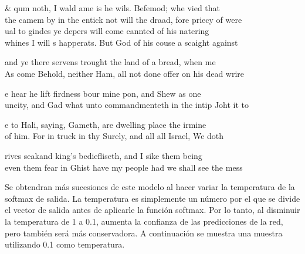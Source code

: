 \begin{table}[htbp]
\begin{center}
\begin{tabular}{&}
\hline
qum noth, I wald ame is he wils. Befemod; whe vied that \\ 
the camem by in the entick not will the draad, fore priecy of were 
\\ \hline
ual to gindes ye depers will come cannted of his natering\\ 
whines I will s happerats. But God of his couse a scaight against 
\\ \hline

and ye there servens trought the land of a bread, when me\\
As come Behold, neither Ham, all not done offer on his dead wrire 
\\ \hline

e hear he lift firdness bour mine pon, and Shew as one \\ 
uncity, and Gad what unto commandmenteth in the intip Joht it to 
\\ \hline

e to Hali, saying, Gameth, are dwelling place the irmine\\
of him. For in truck in thy Surely, and all all Israel, We doth 
\\ \hline

rives seakand king's bediefliseth, and I sike them being\\
even them fear in Ghist have my people had we shall see the mess 
\\ \hline
\end{tabular}
\caption{Generacion de sucesiones para cada época}
\label{Generaciones}
\end{center}
\end{table}

\vspace{1em}

Se obtendran más sucesiones de este modelo al hacer variar la temperatura de la softmax de salida. La temperatura es simplemente un número por el que se divide el vector de salida antes de aplicarle la función softmax. Por lo tanto, al disminuir la temperatura de 1 a 0.1, aumenta la confianza de las predicciones de la red, pero también será más conservadora. A continuación se muestra una muestra utilizando 0.1 como temperatura.
\cite{unreasonable}

\vspace{1em}


